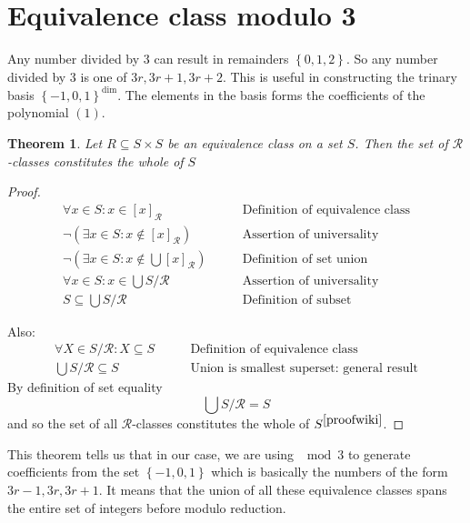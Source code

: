 \documentclass[a4paper,12pt]{article}
\newtheorem*{theorem}{Theorem}
\begin{document}
\section{Equivalence class modulo 3}
Any number divided by 3 can result in remainders $\left\{0,1,2\right\}$. So any number divided by 3 is one of $3r,3r+1,3r+2$. This is useful in constructing the trinary basis $\left\{-1,0,1\right\}^{\text{dim}}$. The elements in the basis forms the coefficients of the polynomial $(1)$.

\begin{theorem}
Let $R\subseteq S\times S$ be an equivalence class on a set $S$. Then the set of $\mathcal{R}$-classes constitutes the whole of $S$
\end{theorem}

\begin{proof}
    \notag
    \begin{align}
        \forall x\in S:x\in[x]_{\mathcal{R}}&\qquad\text{Definition of equivalence class}\\
        \lnot\left(\exists x\in S:x\notin [x]_{\mathcal{R}}\right)&\qquad\text{Assertion of universality}\\
        \lnot\left(\exists x\in S: x\notin\bigcup[x]_{\mathcal{R}}\right)&\qquad\text{Definition of set union}\\
        \forall x\in S:x\in\bigcup S/\mathcal{R}&\qquad\text{Assertion of universality}\\
        S\subseteq\bigcup S/\mathcal{R}&\qquad\text{Definition of subset}
    \end{align}
    
    Also:
    \begin{align}
        \forall X\in S/\mathcal{R}:X\subseteq S&\qquad\text{Definition of equivalence class}\\
        \bigcup S/\mathcal{R}\subseteq S&\qquad\text{Union is smallest superset: general result}
    \end{align}
    By definition of set equality
    $$\bigcup S/\mathcal{R}=S$$
    and so the set of all $\mathcal{R}$-classes constitutes the whole of $S^{\cite{proofwiki}}$.
\end{proof}

\begin{flushleft}
    This theorem tells us that in our case, we are using $\mod 3$ to generate coefficients from the set $\left\{-1,0,1\right\}$ which is basically the numbers of the form $3r-1,3r,3r+1$. It means that the union of all these equivalence classes spans the entire set of integers before modulo reduction.
\end{flushleft}
 
\end{document}
